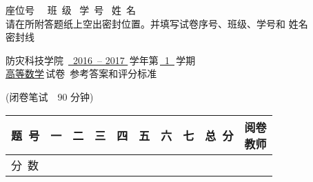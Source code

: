 \documentclass[twocolumn,landscape,UTF8]{ctexart}
\newcommand{\putzdx}{\marginpar{
		\parbox{1cm}{\vspace{-1.6cm}
			\rotatebox[origin=c]{90}{
				\usebox{\zdx}
		}}
}}
\begin{document}
\fancyhf{}
\sbox{\zdx}
{\parbox{27cm}{\centering
	座位号~\underline{\makebox[34mm][c]{}}~ 班~级\underline{\makebox[34mm][c]{}}~ 学~号\underline{\makebox[44mm][c]{}}~ 姓~名\underline{\makebox[34mm][c]{}} ~\\
	\vspace{3mm}
请在所附答题纸上空出密封位置。并填写试卷序号、班级、学号和 姓名\\
\vspace{1mm}
\dotfill{} 密\dotfill{}封\dotfill{}线\dotfill{} \\
	}}
	\reversemarginpar
	
\begin{spacing}{1.25}
	\begin{center}
\begin{LARGE}
防灾科技学院~\underline{~2016~-- 2017 }\,学年第\,\underline{~1~}\,学期\\
\underline{高等数学}\,试卷~参考答案和评分标准\\
\end{LARGE}
(闭卷笔试\ \ 90 分钟)\\
	\vspace{0.5cm}
\begin{tabular}{|m{}|*{8}{m{}|}p{}|}
	\hline
\centering  题~号 & \centering 一 & \centering 二 & \centering 三 & \centering 四& \centering 五 & \centering 六 & \centering 七 %
& \centering 总~分 & \makecell{阅卷\\教师} \rule{0pt}{3mm} \\
	\hline
	\centering 分~数 &  &  &  &  &  &  &  &  &  %
	\rule{0pt}{8mm} \\\hline
\end{tabular}
\end{center}
\end{spacing}
\vspace{-0.5cm}
\setlength{\marginparsep}{1.7cm}
\putzdx %
\vspace{1cm}
\end{document}
